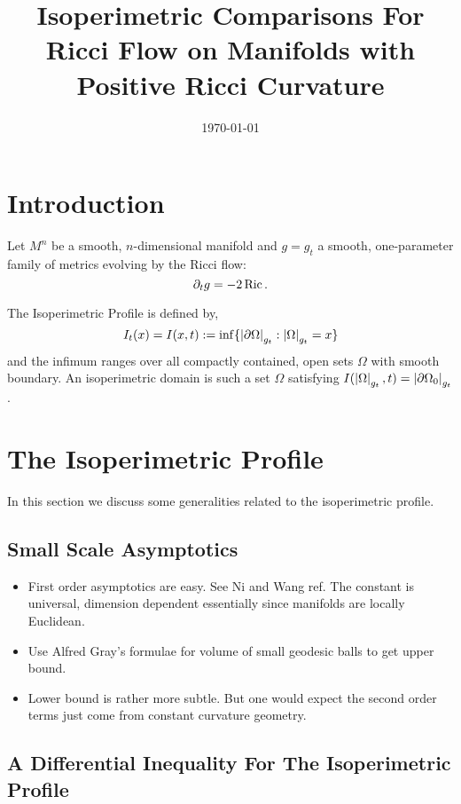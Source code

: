 \documentclass{amsart}
\title[Isoperimetric Comparison: Ricci Flow with Positive Curvature]{Isoperimetric Comparisons For Ricci Flow on Manifolds with Positive Ricci Curvature}
\date{\today}
\begin{document}
\begin{abstract}
\end{abstract}

\maketitle

\section{Introduction}
\label{sec:intro}

Let \(M^n\) be a smooth, \(n\)-dimensional manifold and \(g = g_t\) a smooth, one-parameter family of metrics evolving by the Ricci flow:
\begin{equation}
\label{eq:rf}
\partial_t g = -2 \operatorname{Ric}.
\end{equation}

The Isoperimetric Profile is defined by,
\[
I_t (x) = I(x, t) := \inf\{\left|{\partial {\Omega}}\right|_{g_t} : \left|{\Omega}\right|_{g_t} = x\}
\]
and the infimum ranges over all compactly contained, open sets \(\Omega\) with smooth boundary. An isoperimetric domain is such a set \(\Omega\) satisfying \(I(\left|{\Omega}\right|_{g_t}, t) = \left|{\partial {\Omega_0}}\right|_{g_t}\).

\section{The Isoperimetric Profile}

In this section we discuss some generalities related to the isoperimetric profile.

\subsection{Small Scale Asymptotics}

\begin{itemize}
\item First order asymptotics are easy. See Ni and Wang ref. The constant is universal, dimension dependent essentially since manifolds are locally Euclidean.
\item Use Alfred Gray's formulae for volume of small geodesic balls to get upper bound.
\item Lower bound is rather more subtle. But one would expect the second order terms just come from constant curvature geometry.
\end{itemize}

\subsection{A Differential Inequality For The Isoperimetric Profile}
\label{sec:iso_diff_ineq}
\end{document}
